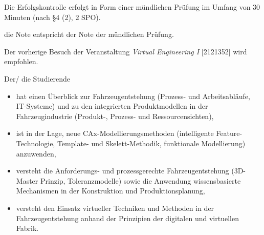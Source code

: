 \begin{course}

\setdoclanguagegerman
{}



\coursehead


\label{cour_7513.dp_997}


\begin{styleenv}
\begin{assessment}
Die Erfolgskontrolle erfolgt in Form einer mündlichen Prüfung im Umfang von 30 Minuten (nach §4 (2), 2 SPO).

 

die Note entspricht der Note der mündlichen Prüfung.


\end{assessment}

\begin{conditions}Der vorherige Besuch der Veranstaltung \emph{Virtual Engineering I} [2121352] wird empfohlen.

\end{conditions}


\end{styleenv}

\begin{learningoutcomes}
Der/ die Studierende

 \begin{itemize}\item hat einen Überblick zur Fahrzeugentstehung (Prozess- und Arbeitsabläufe, IT-Systeme) und zu den integrierten Produktmodellen in der Fahrzeugindustrie (Produkt-, Prozess- und Ressourcensichten),  \item ist in der Lage, neue CAx-Modellierungsmethoden (intelligente Feature-Technologie, Template- und Skelett-Methodik, funktionale Modellierung) anzuwenden,  \item versteht die Anforderungs- und prozessgerechte Fahrzeugentstehung (3D-Master Prinzip, Toleranzmodelle) sowie die Anwendung wissensbasierte Mechanismen in der Konstruktion und Produktionsplanung,  \item versteht den Einsatz virtueller Techniken und Methoden in der Fahrzeugentstehung anhand der Prinzipien der digitalen und virtuellen Fabrik.  \end{itemize}
\end{learningoutcomes}


\end{course}
